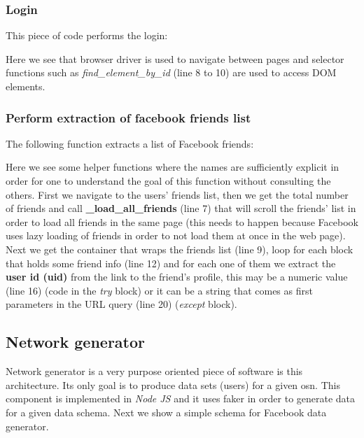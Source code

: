 \subsubsection*{Login}
This piece of code performs the login:



Here we see that browser driver is used to navigate between pages and selector functions such as \textit{find\_element\_by\_id} (line 8 to 10) are used to access DOM elements.

\subsubsection*{Perform extraction of facebook friends list}
The following function extracts a list of Facebook friends:



Here we see some helper functions where the names are sufficiently explicit in order for one to understand the goal of this function without consulting the others. First we navigate to the users' friends list, then we get the total number of friends and call \textbf{\_load\_all\_friends} (line 7) that will scroll the friends' list in order to load all friends in the same page (this needs to happen because Facebook uses lazy loading of friends in order to not load them at once in the web page). Next we get the container that wraps the friends list (line 9), loop for each block that holds some friend info (line 12) and for each one of them we extract the \textbf{user id (uid)} from the link to the friend's profile, this may be a numeric value (line 16) (code in the \textit{try} block) or it can be a string that comes as first parameters in the URL query (line 20) (\textit{except} block).

\subsection{Network generator}

Network generator is a very purpose oriented piece of software is this architecture. Its only goal is to produce data sets (users) for a given \gls{osn}. This component is implemented in \textit{Node JS} and it uses faker \citep{fakerjs} in order to generate data for a given data schema. Next we show a simple schema for Facebook data generator.



